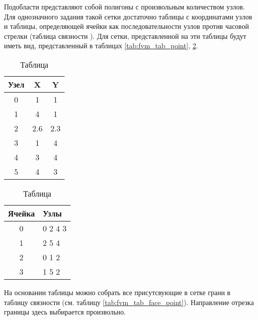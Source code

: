Подобласти представляют собой полигоны с произвольным количеством узлов.
Для однозначного задания такой сетки достаточно таблицы с координатами узлов и таблицы, определяющей ячейки как
последовательности узлов против часовой стрелки (таблица связности ).
Для сетки, представленной на  эти таблицы будут иметь вид, представленный в 
таблицах \ref{tab:fvm_tab_point}, \ref{tab:fvm_tab_cell_point}.
\begin{table}[H]
\begin{center}
  \begin{minipage}[t]{.4\textwidth}
    \begin{tabular}[t]{c|c|c}
    Узел & X & Y \\
    \hline
    0 & 1 & 1 \\
    1 & 4 & 1 \\
    2 & 2.6 & 2.3 \\
    3 & 1 & 4 \\
    4 & 3 & 4 \\
    5 & 4 & 3 \\
    \end{tabular}
    \caption{\label{tab:fvm_tab_point}Таблица узлов}
  \end{minipage}%
  \quad
  \begin{minipage}[t]{.4\textwidth}
    \begin{tabular}[t]{c|l}
    Ячейка & Узлы \\
    \hline
    0 &  0 2 4 3\\
    1 &  2 5 4\\
    2 &  0 1 2\\
    3 &  1 5 2\\
    \end{tabular}
    \caption{\label{tab:fvm_tab_cell_point}Таблица }
  \end{minipage}
\end{center}
\end{table}


На основании таблицы  можно собрать все присутсвующие в сетке
грани в таблицу связности  (см. таблицу \ref{tab:fvm_tab_face_point}).
Направление отрезка границы здесь выбирается произвольно.

